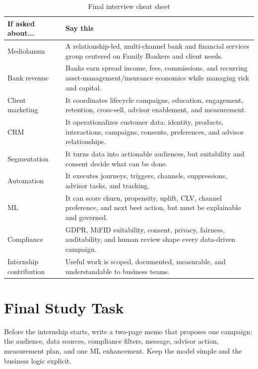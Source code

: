 \documentclass[
	11pt,
	fleqn,
	a4paper,
	oneside,
]{LegrandOrangeBook}
\begin{document}
\begin{table}[H]
	\centering
	\begin{tabularx}{\textwidth}{L{0.22\textwidth} Y}
		\toprule
		\textbf{If asked about...} & \textbf{Say this}\\
		\midrule
		Mediolanum & A relationship-led, multi-channel bank and financial services group centered on Family Bankers and client needs.\\
		Bank revenue & Banks earn spread income, fees, commissions, and recurring asset-management/insurance economics while managing risk and capital.\\
		Client marketing & It coordinates lifecycle campaigns, education, engagement, retention, cross-sell, advisor enablement, and measurement.\\
		CRM & It operationalizes customer data: identity, products, interactions, campaigns, consents, preferences, and advisor relationships.\\
		Segmentation & It turns data into actionable audiences, but suitability and consent decide what can be done.\\
		Automation & It executes journeys, triggers, channels, suppressions, advisor tasks, and tracking.\\
		ML & It can score churn, propensity, uplift, CLV, channel preference, and next best action, but must be explainable and governed.\\
		Compliance & GDPR, MiFID suitability, consent, privacy, fairness, auditability, and human review shape every data-driven campaign.\\
		Internship contribution & Useful work is scoped, documented, measurable, and understandable to business teams.\\
		\bottomrule
	\end{tabularx}
	\caption{Final interview cheat sheet}
\end{table}

\section{Final Study Task}

Before the internship starts, write a two-page memo that proposes one campaign: the audience, data sources, compliance filters, message, advisor action, measurement plan, and one ML enhancement. Keep the model simple and the business logic explicit.
\end{document}
